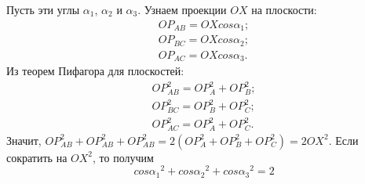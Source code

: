 Пусть эти углы $\alpha_1$, $\alpha_2$ и $\alpha_3$. Узнаем проекции $OX$ на плоскости:
\begin{align*}
	OP_{AB}=OXcos{\alpha_1}; \\
	OP_{BC}=OXcos{\alpha_2}; \\
	OP_{AC}=OXcos{\alpha_3}.
\end{align*}
Из теорем Пифагора для плоскостей:
\begin{align*}
	OP_{AB}^2 = OP_A^2 + OP_B^2; \\
	OP_{BC}^2 = OP_B^2 + OP_C^2; \\
	OP_{AC}^2 = OP_A^2 + OP_C^2.
\end{align*}
Значит, $OP_{AB}^2+OP_{AB}^2+OP_{AB}^2 = 2(OP_A^2 + OP_B^2 + OP_C^2) = 
2OX^2$. Если сократить на $OX^2$, то получим
\begin{equation}
	cos{\alpha_1}^2 + 
	cos{\alpha_2}^2 + 
	cos{\alpha_3}^2 =
	2
\end{equation}